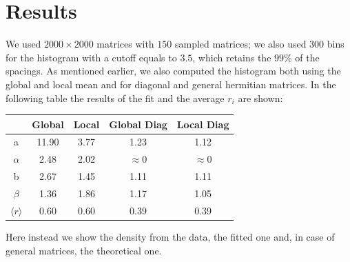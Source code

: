 \documentclass{article}
\begin{document}
\section*{Results}
We used $2000 \times 2000$ matrices with $150$ sampled matrices; we also used $300$ bins for the histogram with a cutoff equals to $3.5$, which retains the $99\%$ of the spacings. As mentioned earlier, we also computed the histogram both using the global and local mean and for diagonal and general hermitian matrices. In the following table the results of the fit and the average $r_i$ are shown:
\begin{center}
	\begin{tabular}{|c|c|c|c|c|}
		\hline 
		& Global & Local & Global Diag & Local Diag \\ 
		\hline 
		a & 11.90 & 3.77 & 1.23 & 1.12  \\ 
		\hline 
		$\alpha$ & 2.48  & 2.02 & $\approx 0$  & $\approx 0$  \\ 
		\hline 
		b & 2.67 & 1.45  &  1.11 & 1.11  \\ 
		\hline 
		$\beta$ & 1.36  & 1.86  & 1.17 & 1.05 \\ 
		\hline
		$\langle r \rangle$ & 0.60 & 0.60 & 0.39 &  0.39\\
		\hline
	\end{tabular} 
\end{center}
Here instead we show the density from the data, the fitted one and, in case of general matrices, the theoretical one.
\end{document}
